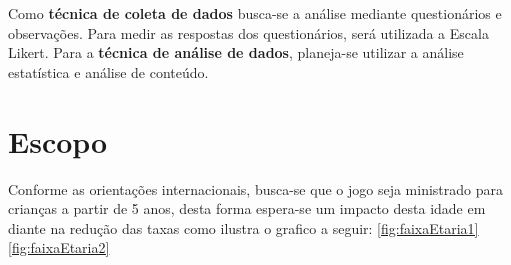 Como \textbf{técnica de coleta de dados} busca-se a análise mediante questionários e observações. Para medir as respostas dos questionários, será utilizada a Escala Likert. Para a \textbf{técnica de análise de dados}, planeja-se utilizar a análise estatística e análise de conteúdo.


\section{Escopo}\label{sec:Escopo}



Conforme as orientações internacionais, busca-se que o jogo seja ministrado para crianças a partir de 5 anos, desta forma espera-se um impacto desta idade em diante na redução das taxas como ilustra o grafico a seguir: \autoref{fig:faixaEtaria1} \autoref{fig:faixaEtaria2}

